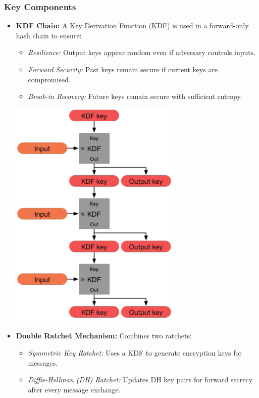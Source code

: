 \subsubsection*{Key Components}
\begin{itemize}
    \item \textbf{KDF Chain:} A Key Derivation Function (KDF) is used in a forward-only hash chain to ensure:
    \begin{itemize}
        \item \textit{Resilience:} Output keys appear random even if adversary controls inputs.
        \item \textit{Forward Security:} Past keys remain secure if current keys are compromised.
        \item \textit{Break-in Recovery:} Future keys remain secure with sufficient entropy.
    \end{itemize}
    \includegraphics[width=0.4\columnwidth]{Resources/signal_kdf.png}
    
    \item \textbf{Double Ratchet Mechanism:} Combines two ratchets:
    \begin{itemize}
        \item \textit{Symmetric Key Ratchet:} Uses a KDF to generate encryption keys for messages.
        \item \textit{Diffie-Hellman (DH) Ratchet:} Updates DH key pairs for forward secrecy after every message exchange.
    \end{itemize}
    

\end{itemize}
